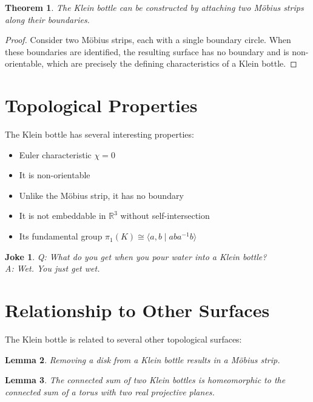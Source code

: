 \documentclass{article}
\newtheorem{theorem}{Theorem}
\newtheorem{lemma}[theorem]{Lemma}
\newtheorem{joke}{Joke}
\begin{document}
\begin{theorem}
    The Klein bottle can be constructed by attaching two Möbius strips along their boundaries.
\end{theorem}

\begin{proof}
    Consider two Möbius strips, each with a single boundary circle. When these boundaries are identified, the resulting surface has no boundary and is non-orientable, which are precisely the defining characteristics of a Klein bottle.
\end{proof}

\section{Topological Properties}

The Klein bottle has several interesting properties:

\begin{itemize}
    \item Euler characteristic $\chi = 0$
    \item It is non-orientable
    \item Unlike the Möbius strip, it has no boundary
    \item It is not embeddable in $\mathbb{R}^3$ without self-intersection
    \item Its fundamental group $\pi_1(K) \cong \langle a, b \mid aba^{-1}b \rangle$
\end{itemize}

\begin{joke}
    Q: What do you get when you pour water into a Klein bottle?\\
    A: Wet. You just get wet.
\end{joke}

\section{Relationship to Other Surfaces}

The Klein bottle is related to several other topological surfaces:

\begin{lemma}
    Removing a disk from a Klein bottle results in a Möbius strip.
\end{lemma}

\begin{lemma}
    The connected sum of two Klein bottles is homeomorphic to the connected sum of a torus with two real projective planes.
\end{lemma}
\end{document}
